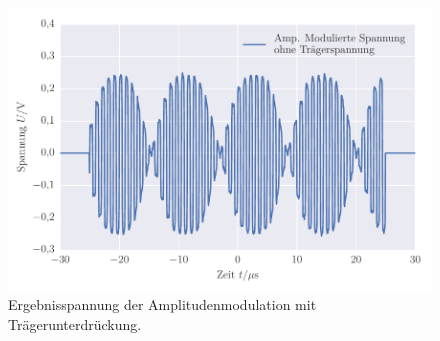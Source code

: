 
\FloatBarrier\begin{figure}[!h]
\centering
\includegraphics[scale=1]{../Grafiken/Amplituden_Modulierte_Spannung_ohne_Traeger.pdf}
\caption{Ergebnisspannung der Amplitudenmodulation mit Trägerunterdrückung. \label{fig:amplituden_modulierte_spannung_ohne_traeger}}
\end{figure}
\FloatBarrier